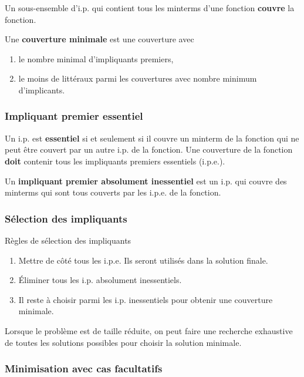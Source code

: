 \documentclass[11pt]{article}
\begin{document}
Un sous-ensemble d'i.p. qui contient tous les minterms d'une fonction
\textbf{couvre} la fonction.

Une \textbf{couverture minimale} est une couverture avec

\begin{enumerate}
\item le nombre minimal d'impliquants premiers,

\item le moins de littéraux parmi les couvertures avec nombre minimum
d'implicants.
\end{enumerate}

\subsubsection{Impliquant premier essentiel}
\label{sec:orge44ef25}

Un i.p. est \textbf{essentiel} si et seulement si il couvre un minterm de la
fonction qui ne peut être couvert par un autre i.p. de la fonction.
Une couverture de la fonction \textbf{doit} contenir tous les impliquants
premiers essentiels (i.p.e.).

Un \textbf{impliquant premier absolument inessentiel} est un i.p. qui couvre
des minterms qui sont tous couverts par les i.p.e. de la fonction.

\subsubsection{Sélection des impliquants}
\label{sec:org6c7eae4}

Règles de sélection des impliquants

\begin{enumerate}
\item Mettre de côté tous les i.p.e. Ils seront utilisés dans la solution
finale.

\item Éliminer tous les i.p. absolument inessentiels.

\item Il reste à choisir parmi les i.p. inessentiels pour obtenir une
couverture minimale.
\end{enumerate}

Lorsque le problème est de taille réduite, on peut faire une recherche
exhaustive de toutes les solutions possibles pour choisir la solution
minimale.

\subsubsection{Minimisation avec cas facultatifs}
\label{sec:orgf5c12f2}
\end{document}
